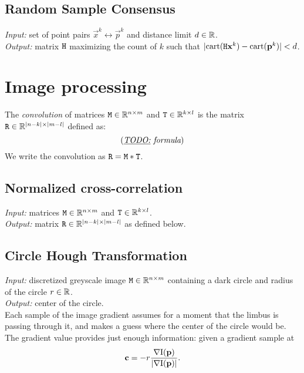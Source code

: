 \subsection{Random Sample Consensus}

\textit{Input:} set of point pairs $\vec x^k \leftrightarrow \vec p^k$ and distance limit $d \in \mathbb{R}$.\\
\textit{Output:} matrix $\mathtt{H}$ maximizing the count of $k$ such that $|\mathrm{cart}(\mathtt{H} \mathbf{x}^k) - \mathrm{cart}(\mathbf{p}^k)| < d$.\\

\cite[p.117]{hartley03}

\section{Image processing}

\begin{definition}
The \textit{convolution} of matrices $\mathtt{M} \in \mathbb{R}^{n \times m}$ and $\mathtt{T} \in \mathbb{R}^{k \times l}$ is the matrix $\mathtt{R} \in \mathbb{R}^{|n-k| \times |m - l|}$ defined as:
$$(\textit{\underline{TODO:} formula})
$$
We write the convolution as $\mathtt{R} = \mathtt{M} \ast \mathtt{T}$.
\end{definition}

\subsection{Normalized cross-correlation}

\textit{Input:} matrices $\mathtt{M} \in \mathbb{R}^{n \times m}$ and $\mathtt{T} \in \mathbb{R}^{k \times l}$.\\
\textit{Output:} matrix $\mathtt{R} \in \mathbb{R}^{|n-k| \times |m - l|}$ as defined below.\\


\subsection{Circle Hough Transformation}
\label{s:algo-hough}

\textit{Input:} discretized greyscale image $\mathtt{M} \in \mathbb{R}^{n \times m}$ containing a dark circle and radius of the circle $r \in \mathbb{R}$.\\
\textit{Output:} center of the circle.\\

Each sample of the image gradient assumes for a moment that the limbus is passing through it, and makes a guess where the center of the circle would be.
The gradient value provides just enough information: given a gradient sample at 
$$\mathbf{c} = -r \frac {\nabla \mathrm{I}(\mathbf{p})} {|\nabla \mathrm{I}(\mathbf{p})|}.$$

